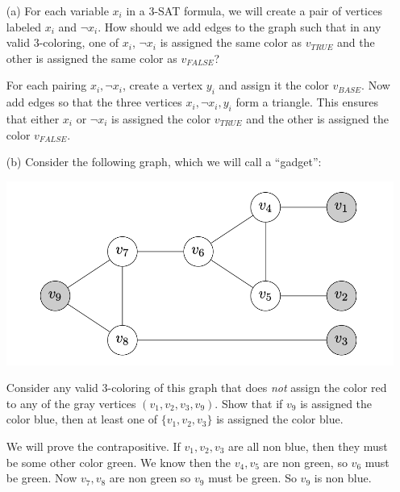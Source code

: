 \documentclass{article}
\begin{document}
    \begin{itemize}
        \item [(a)] For each variable $x_{i}$ in a $3$-SAT formula, we will create a pair of vertices labeled $x_{i}$ and $\lnot x_{i}$. How should we add edges to the graph such that in any valid $3$-coloring, one of $x_{i}$, $\lnot x_{i}$ is assigned the same color as $v_{TRUE}$ and the other is assigned the same color as $v_{FALSE}$?
            \begin{answer}
                For each pairing $x_{i}, \lnot x_{i}$, create a vertex $y_{i}$ and assign it the color $v_{BASE}$. Now add edges so that the three vertices $x_{i}, \lnot x_{i}, y_{i}$ form a triangle. This ensures that either $x_{i}$ or $\lnot x_{i}$ is assigned the color $v_{TRUE}$ and the other is assigned the color $v_{FALSE}$.
            \end{answer}

        \item [(b)] Consider the following graph, which we will call a ``gadget'':
            \begin{center}
                \includegraphics[scale=0.5]{graph.png}
            \end{center}
        Consider any valid $3$-coloring of this graph that does \textit{not} assign the color red to any of the gray vertices $(v_{1}, v_{2}, v_{3}, v_{9})$. Show that if $v_{9}$ is assigned the color blue, then at least one of $\{v_{1}, v_{2}, v_{3}\}$ is assigned the color blue.
            \begin{answer}
                We will prove the contrapositive. If $v_{1}, v_{2}, v_{3}$ are all non blue, then they must be some other color green. We know then the $v_{4}, v_{5}$ are non green, so $v_{6}$ must be green. Now $v_{7}, v_{8}$ are non green so $v_{9}$ must be green. So $v_{9}$ is non blue.
            \end{answer}


\end{itemize}
\end{document}
